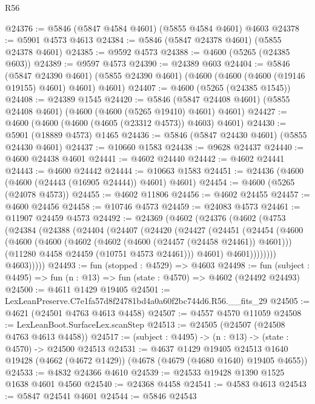 \begin{lexlean}{R56}
\begin{coremodule}
@24376 := @5846 (@5847 @4584 @4601) (@5855 @4584 @4601) @4603
@24378 := @5901 @4573 @4613
@24384 := @5846 (@5847 @24378 @4601) (@5855 @24378 @4601)
@24385 := @9592 @4573
@24388 := @4600 (@5265 (@24385 @603))
@24389 := @9597 @4573
@24390 := @24389 @603
@24404 := @5846
    (@5847 @24390 @4601)
    (@5855 @24390 @4601)
    (@4600 (@4600 (@4600 (@19146 @19155) @4601) @4601) @4601)
@24407 := @4600 (@5265 (@24385 @1545))
@24408 := @24389 @1545
@24420 := @5846 (@5847 @24408 @4601) (@5855 @24408 @4601) (@4600 (@4600 (@5265 @19410) @4601) @4601)
@24427 := @4600 (@4600 (@4600 (@4605 (@23312 @4573)) @4603) @4601)
@24430 := @5901 (@18889 @4573) @1465
@24436 := @5846 (@5847 @24430 @4601) (@5855 @24430 @4601)
@24437 := @10660 @1583
@24438 := @9628 @24437
@24440 := @4600 @24438 @4601
@24441 := @4602 @24440
@24442 := @4602 @24441
@24443 := @4600 @24442
@24444 := @10663 @1583
@24451 := @24436 (@4600 (@4600 (@24443 (@16905 @24444)) @4601) @4601)
@24454 := @4600 (@5265 (@24078 @4573))
@24455 := @4602 @11806
@24456 := @4602 @24455
@24457 := @4600 @24456
@24458 := @10746 @4573
@24459 := @24083 @4573
@24461 := @11907 @24459 @4573
@24492 := @24369
    (@4602
      (@24376
        (@4602
          (@4753
            (@24384
              (@24388
                (@24404
                  (@24407
                    (@24420
                      (@24427
                        (@24451
                          (@24454
                            (@4600
                              (@4600
                                (@4600
                                  (@4602 (@4602 (@4600 (@24457 (@24458 @24461)) @4601)))
                                  (@11280 @4458 @24459 (@10751 @4573 @24461)))
                                @4601)
                              @4601))))))))
              @4603)))))
@24493 := fun (stopped : @4529) => @4603
@24498 := fun (subject : @4495) => fun (n : @13) => fun (state : @4570) => @4602 (@24492 @24493)
@24500 := @4611 @1429 @19405
@24501 := LexLeanPreserve.C7e1fa57d8f24781bd4a0a60f2bc744d6.R56.__fits_29
@24505 := @4621 (@24501 @4763 @4613 @4458)
@24507 := @4557 @4570 @11059
@24508 := LexLeanBoot.SurfaceLex.scanStep
@24513 := @24505 (@24507 (@24508 @4763 @4613 @4458))
@24517 := (subject : @4495) -> (n : @13) -> (state : @4570) -> @24500 @24513
@24531 := @4637
    @1429
    @19405
    @24513
    @1640
    @19428
    (@4662 (@4672 @1429))
    (@4678 (@4679 (@4680 @1640) @19405 @4655))
@24533 := @4832 @24366 @4610
@24539 := @24533 @19428 @1390 @1525 @1638 @4601 @4560
@24540 := @24368 @4458
@24541 := @4583 @4613
@24543 := @5847 @24541 @4601
@24544 := @5846 @24543

\end{coremodule}
\end{lexlean}
